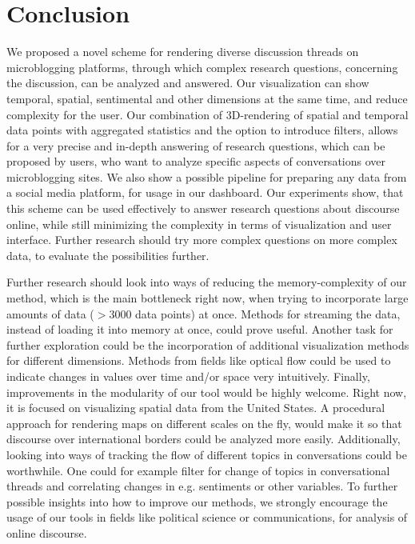 \chapter{Conclusion}
We proposed a novel scheme for rendering diverse discussion threads on microblogging platforms, through which complex research questions, concerning the discussion, can be analyzed and answered. Our visualization can show temporal, spatial, sentimental and other dimensions at the same time, and reduce complexity for the user. Our combination of 3D-rendering of spatial and temporal data points with aggregated statistics and the option to introduce filters, allows for a very precise and in-depth answering of research questions, which can be proposed by users, who want to analyze specific aspects of conversations over microblogging sites. We also show a possible pipeline for preparing any data from a social media platform, for usage in our dashboard. Our experiments show, that this scheme can be used effectively to answer research questions about discourse online, while still minimizing the complexity in terms of visualization and user interface. Further research should try more complex questions on more complex data, to evaluate the possibilities further.  

Further research should look into ways of reducing the memory-complexity of our method, which is the main bottleneck right now, when trying to incorporate large amounts of data ($>3000$ data points) at once. Methods for streaming the data, instead of loading it into memory at once, could prove useful. Another task for further exploration could be the incorporation of additional visualization methods for different dimensions. Methods from fields like optical flow could be used to indicate changes in values over time and/or space very intuitively. Finally, improvements in the modularity of our tool would be highly welcome. Right now, it is focused on visualizing spatial data from the United States. A procedural approach for rendering maps on different scales on the fly, would make it so that discourse over international borders could be analyzed more easily. Additionally, looking into ways of tracking the flow of different topics in conversations could be worthwhile. One could for example filter for change of topics in conversational threads and correlating changes in e.g. sentiments or other variables.
To further possible insights into how to improve our methods, we strongly encourage the usage of our tools in fields like political science or communications, for analysis of online discourse.
